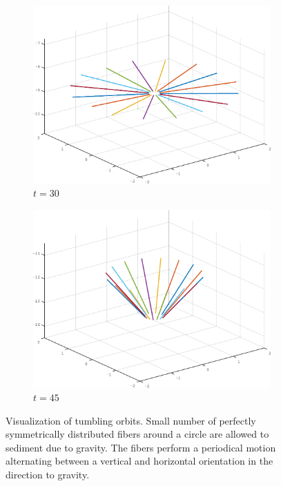\begin{figure}[!htbp]
\begin{subfigure}[h]{0.45\textwidth}
    \includegraphics[width=\textwidth]{img/ring_00030.pdf}
    \caption{$t=30$}\label{fig:ring_simulation_1c}
  \end{subfigure}
  \begin{subfigure}[h]{0.45\textwidth}
    \centering
    \includegraphics[width=\textwidth]{img/ring_00045.pdf}
    \caption{$t=45$}\label{fig:ring_simulation_1d}
  \end{subfigure}
  \caption[Visualization of tumbling orbits.]{Visualization of tumbling orbits. Small number of perfectly symmetrically distributed fibers around a circle are allowed to sediment due to gravity. The fibers perform a periodical motion alternating between a vertical and horizontal orientation in the direction to gravity.}
  \label{fig:ring_simulation}
\end{figure}

